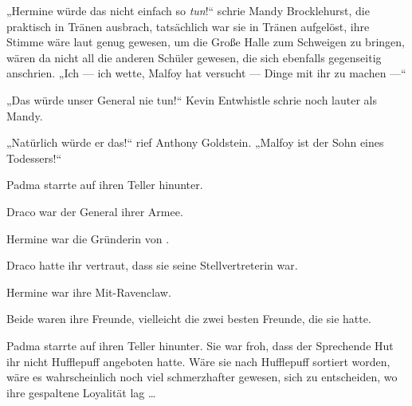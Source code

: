„Hermine würde das nicht einfach so \emph{tun}!“ schrie Mandy Brocklehurst, die praktisch in Tränen ausbrach, tatsächlich war sie in Tränen aufgelöst, ihre Stimme wäre laut genug gewesen, um die Große Halle zum Schweigen zu bringen, wären da nicht all die anderen Schüler gewesen, die sich ebenfalls gegenseitig anschrien.
„Ich — ich wette, Malfoy hat versucht — Dinge mit ihr zu machen —“

„Das würde unser General nie tun!“ Kevin Entwhistle schrie noch lauter als Mandy.

„Natürlich würde er das!“ rief Anthony Goldstein.
„Malfoy ist der Sohn eines Todessers!“






Padma starrte auf ihren Teller hinunter.

Draco war der General ihrer Armee.

Hermine war die Gründerin von \SPHEW.

Draco hatte ihr vertraut, dass sie seine Stellvertreterin war.

Hermine war ihre Mit-Ravenclaw.

Beide waren ihre Freunde, vielleicht die zwei besten Freunde, die sie hatte.

Padma starrte auf ihren Teller hinunter. Sie war froh, dass der Sprechende Hut ihr nicht Hufflepuff angeboten hatte. Wäre sie nach Hufflepuff sortiert worden, wäre es wahrscheinlich noch viel schmerzhafter gewesen, sich zu entscheiden, wo ihre gespaltene Loyalität lag …

